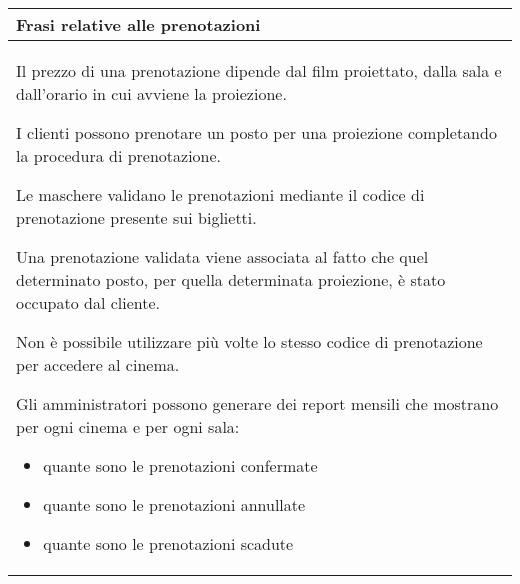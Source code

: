 \begin{tabularx}{\linewidth}{|X|}
    \hline
    \rowcolor{tblhdrcolor}
    \textbf{Frasi relative alle prenotazioni} \\\hline
    Il prezzo di una prenotazione dipende dal film proiettato,
    dalla sala e dall'orario in cui avviene la proiezione.
    
    I clienti possono prenotare un posto per una proiezione
    completando la procedura di prenotazione.
    
    Le maschere validano le prenotazioni mediante il codice
    di prenotazione presente sui biglietti.
    
    Una prenotazione validata viene associata al fatto che quel
    determinato posto, per quella determinata proiezione,
    è stato occupato dal cliente.
    
    Non è possibile utilizzare più volte lo stesso codice di
    prenotazione per accedere al cinema.
    
    Gli amministratori possono generare dei report mensili che
    mostrano per ogni cinema e per ogni sala:
    \begin{itemize}
        \item quante sono le prenotazioni confermate
        \item quante sono le prenotazioni annullate
        \item quante sono le prenotazioni scadute
    \end{itemize}
    \\ \hline
\end{tabularx}

